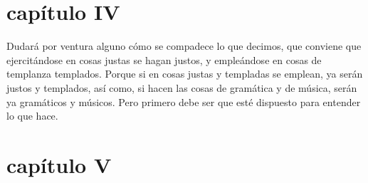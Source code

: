 \begin{multicols}{2}
\section*{capítulo IV}
Dudará por ventura alguno cómo se compadece lo que decimos, que conviene que ejercitándose en cosas justas se hagan justos, y empleándose en cosas de templanza templados. Porque si en cosas justas y
templadas se emplean, ya serán justos y templados, así como, si hacen las cosas de gramática y de música, serán ya gramáticos y músicos. Pero primero debe ser que esté dispuesto para entender lo que hace.\\

\section*{capítulo V}


\end{multicols}


